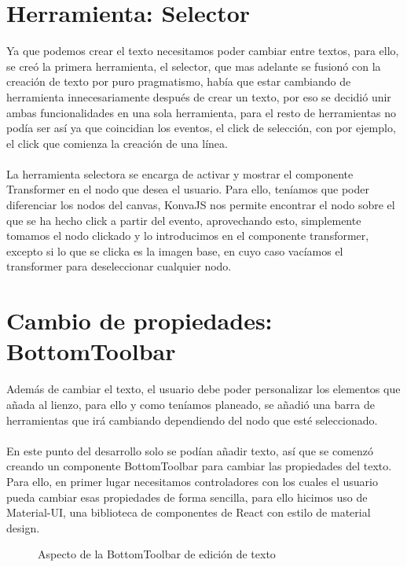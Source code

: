 \section{Herramienta: Selector}
Ya que podemos crear el texto necesitamos poder cambiar entre textos, para ello, se creó
la primera herramienta, el selector, que mas adelante se fusionó con la creación de texto
por puro pragmatismo, había que estar cambiando de herramienta innecesariamente después
de crear un texto, por eso se decidió unir ambas funcionalidades en una sola herramienta,
para el resto de herramientas no podía ser así ya que coincidian los eventos, el click 
de selección, con por ejemplo, el click que comienza la creación de una línea.
\\\\
La herramienta selectora se encarga de activar y mostrar el componente Transformer en
el nodo que desea el usuario.
Para ello, teníamos que poder diferenciar los nodos del canvas, KonvaJS\cite{KonvaJS}
nos permite encontrar el nodo sobre el que se ha hecho click a partir del evento, 
aprovechando esto, simplemente tomamos el nodo clickado y lo introducimos en el componente
transformer, excepto si lo que se clicka es la imagen base, en cuyo caso vacíamos el transformer
para deseleccionar cualquier nodo.

\section{Cambio de propiedades: BottomToolbar}


Además de cambiar el texto, el usuario debe poder personalizar los elementos que añada al lienzo,
para ello y como teníamos planeado, se añadió una barra de herramientas que irá cambiando
dependiendo del nodo que esté seleccionado.
\\\\
En este punto del desarrollo solo se podían añadir texto, así que se comenzó creando un componente
BottomToolbar para cambiar las propiedades del texto.
Para ello, en primer lugar necesitamos controladores con los cuales el usuario pueda cambiar 
esas propiedades de forma sencilla, para ello hicimos uso de Material-UI\cite{materialui}, una 
biblioteca de componentes de React con estilo de material design.
\\
\begin{figure}[!h]
  \centering
  \noindent{}
  \caption{Aspecto de la BottomToolbar de edición de texto}
\end{figure}

